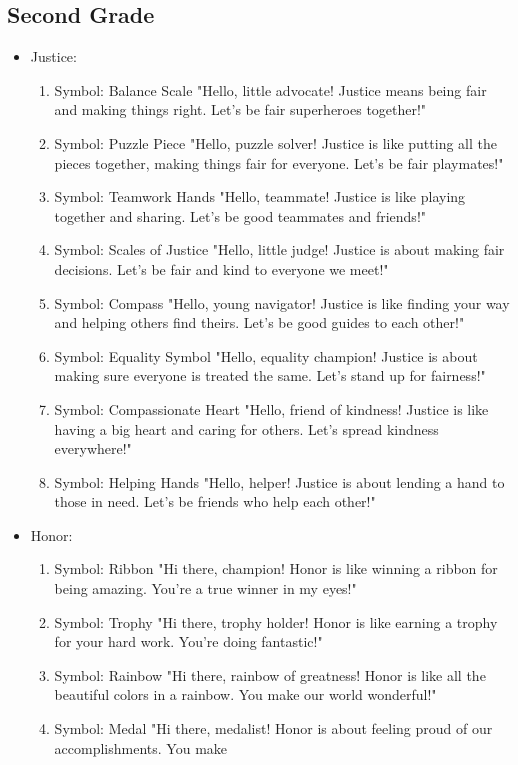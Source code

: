 \documentclass[11pt]{article}
\begin{document}
\subsection{Second Grade}
\label{sec:orgb479739}
\begin{itemize}
\item Justice:
\begin{enumerate}
\item Symbol: Balance Scale
"Hello, little advocate! Justice means being fair and making things right. Let's
be fair superheroes together!"
\item Symbol: Puzzle Piece
"Hello, puzzle solver! Justice is like putting all the pieces together, making
things fair for everyone. Let's be fair playmates!"
\item Symbol: Teamwork Hands
"Hello, teammate! Justice is like playing together and sharing. Let's be good
teammates and friends!"
\item Symbol: Scales of Justice
"Hello, little judge! Justice is about making fair decisions. Let's be fair and
kind to everyone we meet!"
\item Symbol: Compass
"Hello, young navigator! Justice is like finding your way and helping others find
theirs. Let's be good guides to each other!"
\item Symbol: Equality Symbol
"Hello, equality champion! Justice is about making sure everyone is treated the
same. Let's stand up for fairness!"
\item Symbol: Compassionate Heart
"Hello, friend of kindness! Justice is like having a big heart and caring for
others. Let's spread kindness everywhere!"
\item Symbol: Helping Hands
"Hello, helper! Justice is about lending a hand to those in need. Let's be friends
who help each other!"
\end{enumerate}
\item Honor:
\begin{enumerate}
\item Symbol: Ribbon
"Hi there, champion! Honor is like winning a ribbon for being amazing. You're a
true winner in my eyes!"
\item Symbol: Trophy
"Hi there, trophy holder! Honor is like earning a trophy for your hard work.
You're doing fantastic!"
\item Symbol: Rainbow
"Hi there, rainbow of greatness! Honor is like all the beautiful colors in a
rainbow. You make our world wonderful!"
\item Symbol: Medal
"Hi there, medalist! Honor is about feeling proud of our accomplishments. You make

\end{enumerate}
\end{itemize}
\end{document}
